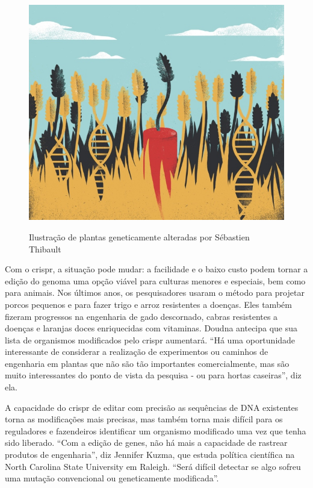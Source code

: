 \documentclass{report}
\begin{document}
\begin{figure}[h]
\center
\includegraphics[scale=0.4]{farm}
\label{farm}
\caption {Ilustração de plantas geneticamente alteradas por Sébastien Thibault}
\end{figure}

Com o \ac{crispr}, a situação pode mudar: a facilidade e o baixo custo podem tornar a edição do genoma uma opção viável para culturas menores e especiais, bem como para animais. Nos últimos anos, os pesquisadores usaram o método para projetar porcos pequenos e para fazer trigo e arroz resistentes a doenças. Eles também fizeram progressos na engenharia de gado descornado, cabras resistentes a doenças e laranjas doces enriquecidas com vitaminas. Doudna antecipa que sua lista de organismos modificados pelo \ac{crispr} aumentará. “Há uma oportunidade interessante de considerar a realização de experimentos ou caminhos de engenharia em plantas que não são tão importantes comercialmente, mas são muito interessantes do ponto de vista da pesquisa - ou para hortas caseiras”, diz ela.

A capacidade do \ac{crispr} de editar com precisão as sequências de DNA existentes torna as modificações mais precisas, mas também torna mais difícil para os reguladores e fazendeiros identificar um organismo modificado uma vez que tenha sido liberado. “Com a edição de genes, não há mais a capacidade de rastrear produtos de engenharia”, diz Jennifer Kuzma, que estuda política científica na North Carolina State University em Raleigh. “Será difícil detectar se algo sofreu uma mutação convencional ou geneticamente modificada”.
\end{document}
